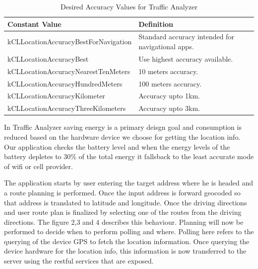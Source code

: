 \documentclass[10pt]{sigplan-proc-varsize}
\begin{document}
\begin{table}[ht]
\caption{Desired Accuracy Values for Traffic Analyzer}
\centering
\begin{tabular}{l p{2cm}} \hline
Constant Value & Definition \\
\hline
kCLLocationAccuracyBestForNavigation & Standard accuracy intended for navigational apps. \\
kCLLocationAccuracyBest & Use highest accuracy available. \\
kCLLocationAccuracyNearestTenMeters & 10 meters accuracy. \\
kCLLocationAccuracyHundredMeters & 100 meters accuracy. \\
kCLLocationAccuracyKilometer & Accuracy upto 1km. \\
kCLLocationAccuracyThreeKilometers & Accuracy upto 3km. \\
\hline
\end{tabular}
\label{table:desaccuracy}
\end{table}

In Traffic Analyzer saving energy is a primary deisgn goal and consumption is reduced based on the hardware device we choose for getting the location info. Our application checks the battery level and when the energy levels of the battery depletes to 30\% of the total energy it fallsback to the least accurate mode of wifi or cell provider.

The application starts by user entering the target address where he is headed and a route planning is performed. Once the input address is forward geocoded so that address is translated to latitude and longitude. Once the driving directions and user route plan is finalized by selecting  one of the routes from the driving directions. The figure 2,3 and 4 describes this behaviour. Planning will now be performed to decide when to perform polling and where. Polling here refers to the querying of the device GPS to fetch the location information. Once querying the device hardware for the location info, this information is now transferred to the server using the restful services that are exposed.
\end{document}
